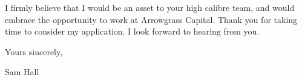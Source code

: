 I firmly believe that I would be an asset to your high calibre team, and would embrace the
opportunity to work at Arrowgrass Capital.
Thank you for taking time to consider my application.
I look forward to hearing from you.










Yours sincerely,


Sam Hall


